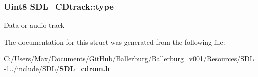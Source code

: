 \subsubsection[{type}]{\setlength{\rightskip}{0pt plus 5cm}Uint8 S\+D\+L\+\_\+\+C\+Dtrack\+::type}\label{struct_s_d_l___c_dtrack_adc74ef4de78c8418f229e3efd24a076f}
Data or audio track 

The documentation for this struct was generated from the following file\+:\begin{DoxyCompactItemize}
\item 
C\+:/\+Users/\+Max/\+Documents/\+Git\+Hub/\+Ballerburg/\+Ballerburg\+\_\+v001/\+Resources/\+S\+D\+L-\/1../include/\+S\+D\+L/{\bf S\+D\+L\+\_\+cdrom.\+h}\end{DoxyCompactItemize}
